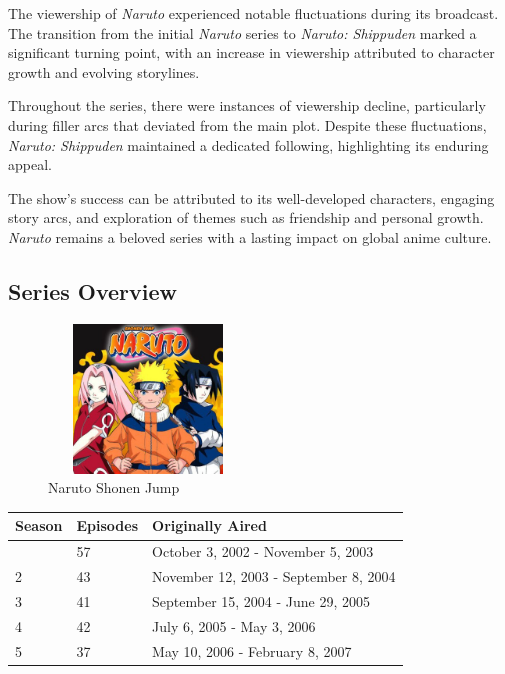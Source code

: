 \documentclass[
  letterpaper,
  DIV=11,
  numbers=noendperiod]{scrartcl}
\begin{document}
The viewership of \emph{Naruto} experienced notable fluctuations during
its broadcast. The transition from the initial \emph{Naruto} series to
\emph{Naruto: Shippuden} marked a significant turning point, with an
increase in viewership attributed to character growth and evolving
storylines.

Throughout the series, there were instances of viewership decline,
particularly during filler arcs that deviated from the main plot.
Despite these fluctuations, \emph{Naruto: Shippuden} maintained a
dedicated following, highlighting its enduring appeal.

The show's success can be attributed to its well-developed characters,
engaging story arcs, and exploration of themes such as friendship and
personal growth. \emph{Naruto} remains a beloved series with a lasting
impact on global anime culture.

\hypertarget{series-overview}{%
\subsection{Series Overview}\label{series-overview}}

\begin{figure}

{\centering \includegraphics[width=2.08333in,height=1.5625in]{quarto2_files/mediabag/19726bbf6804a22d703d.jpg}

}

\caption{Naruto Shonen Jump}

\end{figure}

\begin{longtable}[]{@{}lll@{}}
\toprule\noalign{}
Season & Episodes & Originally Aired \\
\midrule\noalign{}
\endhead
\bottomrule\noalign{}
\endlastfoot
1 & 57 & October 3, 2002 - November 5, 2003 \\
2 & 43 & November 12, 2003 - September 8, 2004 \\
3 & 41 & September 15, 2004 - June 29, 2005 \\
4 & 42 & July 6, 2005 - May 3, 2006 \\
5 & 37 & May 10, 2006 - February 8, 2007 \\
\end{longtable}
\end{document}
